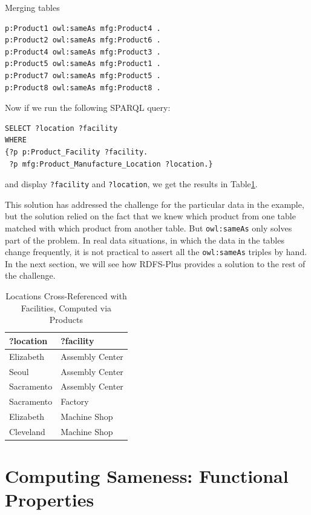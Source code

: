 \begin{challenge}{Merging tables}
\begin{lstlisting}
p:Product1 owl:sameAs mfg:Product4 .
p:Product2 owl:sameAs mfg:Product6 .
p:Product4 owl:sameAs mfg:Product3 .
p:Product5 owl:sameAs mfg:Product1 .
p:Product7 owl:sameAs mfg:Product5 .
p:Product8 owl:sameAs mfg:Product8 .
\end{lstlisting}

Now if we run the following SPARQL query:

\begin{lstlisting}
SELECT ?location ?facility 
WHERE
{?p p:Product_Facility ?facility.
 ?p mfg:Product_Manufacture_Location ?location.}
\end{lstlisting}

and display \texttt{?facility} and \texttt{?location}, we get the results in Table\ref{tab:ch9.3}.
\end{challenge}

This solution has addressed the challenge for the particular data in the
example, but the solution relied on the fact that we knew which product
from one table matched with which product from another table. But
\texttt{owl:sameAs} only solves part of the problem. In real data situations, in
which the data in the tables change  frequently, it is not practical to assert all the \texttt{owl:sameAs} triples by
hand. In the next section, we will see how
RDFS-Plus provides a solution to the rest of the challenge.

\begin{table}
\caption{Locations Cross-Referenced with Facilities, Computed via
Products\label{tab:ch9.3}}
\begin{tabular}{|ll|}
\hline
?location&?facility\\
\hline
Elizabeth&Assembly Center\\
Seoul&Assembly Center\\
Sacramento&Assembly Center\\
Sacramento&Factory\\
Elizabeth&Machine Shop\\
Cleveland&Machine Shop \\
\hline
\end{tabular}
\end{table}



\section{Computing Sameness: Functional Properties}

